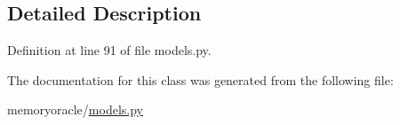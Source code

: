 \subsection{Detailed Description}


Definition at line 91 of file models.\+py.



The documentation for this class was generated from the following file\+:\begin{DoxyCompactItemize}
\item 
memoryoracle/\hyperlink{models_8py}{models.\+py}\end{DoxyCompactItemize}
